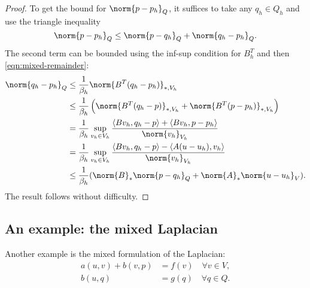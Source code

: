 \begin{proof}
	To get the bound for $\norm{p-p_h}_Q$, it suffices to take any $q_h \in Q_h$ and use the triangle inequality
	\[
	\norm{p-p_h}_Q \le \norm{p-q_h}_Q + \norm{q_h-p_h}_Q.
	\]
	The second term can be bounded using the inf-sup condition for $B_h^T$ and then \eqref{eqn:mixed-remainder}:
	\begin{align}
	\norm{q_h-p_h}_Q &\le \frac{1}{\beta_h} \norm{B^T(q_h - p_h)}_{*,V_h} \\
	&\le \frac{1}{\beta_h} \left( \norm{B^T(q_h - p)}_{*,V_h} + \norm{B^T(p - p_h)}_{*,V_h} \right) \\
	&= \frac{1}{\beta_h} \sup_{v_h \in V_h} \frac{\langle  B v_h, q_h - p \rangle + \langle B v_h, p - p_h \rangle}{\norm{v_h}_{V_h}} \\
	&= \frac{1}{\beta_h} \sup_{v_h \in V_h} \frac{\langle  B v_h, q_h - p \rangle - \langle A (u-u_h) , v_h \rangle}{\norm{v_h}_{V_h}} \\
	&\le \frac{1}{\beta_h} (\norm{B}_* \norm{p-q_h}_Q + \norm{A}_*\norm{u-u_h}_V).
	\end{align}
	The result follows without difficulty.
\end{proof}


\subsection{An example: the mixed Laplacian}
Another example is the mixed formulation of the Laplacian:
\begin{equation}
    \begin{aligned}
        a(u, v) + b(v, p) &= f(v) \quad \forall v \in V, \\
        b(u, q) &= g(q) \quad \forall q \in Q.
    \end{aligned}
\end{equation}

